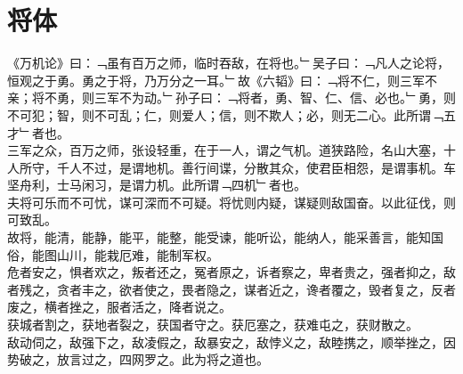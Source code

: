 \chapter{将体}%
《万机论》曰：﹁虽有百万之师，临时吞敌，在将也。﹂吴子曰：﹁凡人之论将，恒观之于勇。勇之于将，乃万分之一耳。﹂故《六韬》曰：﹁将不仁，则三军不亲；将不勇，则三军不为动。﹂孙子曰：﹁将者，勇、智、仁、信、必也。﹂勇，则不可犯；智，则不可乱；仁，则爱人；信，则不欺人；必，则无二心。此所谓﹁五才﹂者也。\\
三军之众，百万之师，张设轻重，在于一人，谓之气机。道狭路险，名山大塞，十人所守，千人不过，是谓地机。善行间谍，分散其众，使君臣相怨，是谓事机。车坚舟利，士马闲习，是谓力机。此所谓﹁四机﹂者也。\\
夫将可乐而不可忧，谋可深而不可疑。将忧则内疑，谋疑则敌国奋。以此征伐，则可致乱。\\
故将，能清，能静，能平，能整，能受谏，能听讼，能纳人，能采善言，能知国俗，能图山川，能栽厄难，能制军权。\\
危者安之，惧者欢之，叛者还之，冤者原之，诉者察之，卑者贵之，强者抑之，敌者残之，贪者丰之，欲者使之，畏者隐之，谋者近之，谗者覆之，毁者复之，反者废之，横者挫之，服者活之，降者说之。\\
获城者割之，获地者裂之，获国者守之。获厄塞之，获难屯之，获财散之。\\
敌动伺之，敌强下之，敌凌假之，敌暴安之，敌悖义之，敌睦携之，顺举挫之，因势破之，放言过之，四网罗之。此为将之道也。\\
